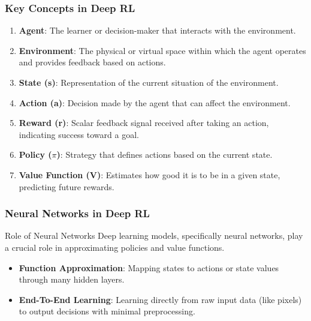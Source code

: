 \documentclass[aspectratio=169]{beamer}
\begin{document}
\begin{frame}[fragile]
    \frametitle{Key Concepts in Deep RL}
    \begin{enumerate}
        \item \textbf{Agent}: The learner or decision-maker that interacts with the environment.
        \item \textbf{Environment}: The physical or virtual space within which the agent operates and provides feedback based on actions.
        \item \textbf{State (s)}: Representation of the current situation of the environment.
        \item \textbf{Action (a)}: Decision made by the agent that can affect the environment.
        \item \textbf{Reward (r)}: Scalar feedback signal received after taking an action, indicating success toward a goal.
        \item \textbf{Policy ($\pi$)}: Strategy that defines actions based on the current state.
        \item \textbf{Value Function (V)}: Estimates how good it is to be in a given state, predicting future rewards.
    \end{enumerate}
\end{frame}

\begin{frame}[fragile]
    \frametitle{Neural Networks in Deep RL}
    \begin{block}{Role of Neural Networks}
        Deep learning models, specifically neural networks, play a crucial role in approximating policies and value functions.
    \end{block}
    \begin{itemize}
        \item \textbf{Function Approximation}: Mapping states to actions or state values through many hidden layers.
        \item \textbf{End-To-End Learning}: Learning directly from raw input data (like pixels) to output decisions with minimal preprocessing.
    \end{itemize}
\end{frame}
\end{document}
